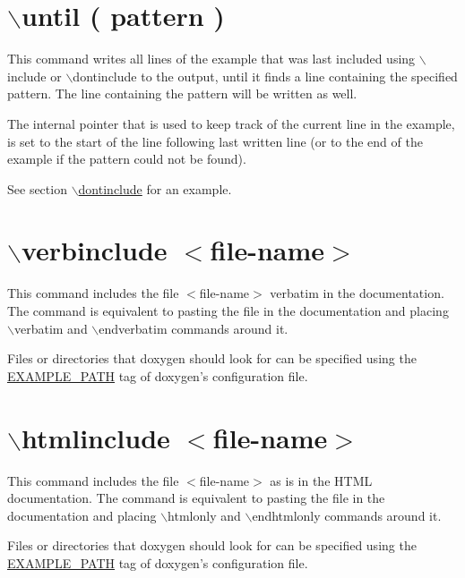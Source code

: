  \hypertarget{commands_cmduntil}{}\section{$\backslash$until ( pattern )}\label{commands_cmduntil}
 This command writes all lines of the example that was last included using $\backslash$include or $\backslash$dontinclude to the output, until it finds a line containing the specified pattern. The line containing the pattern will be written as well.

The internal pointer that is used to keep track of the current line in the example, is set to the start of the line following last written line (or to the end of the example if the pattern could not be found).

See section \hyperlink{commands_cmddontinclude}{$\backslash$dontinclude} for an example.



 \hypertarget{commands_cmdverbinclude}{}\section{$\backslash$verbinclude $<$file-\/name$>$}\label{commands_cmdverbinclude}
 This command includes the file $<$file-\/name$>$ verbatim in the documentation. The command is equivalent to pasting the file in the documentation and placing $\backslash$verbatim and $\backslash$endverbatim commands around it.

Files or directories that doxygen should look for can be specified using the \hyperlink{config_cfg_example_path}{EXAMPLE\_\-PATH} tag of doxygen's configuration file.



 \hypertarget{commands_cmdhtmlinclude}{}\section{$\backslash$htmlinclude $<$file-\/name$>$}\label{commands_cmdhtmlinclude}
 This command includes the file $<$file-\/name$>$ as is in the HTML documentation. The command is equivalent to pasting the file in the documentation and placing $\backslash$htmlonly and $\backslash$endhtmlonly commands around it.

Files or directories that doxygen should look for can be specified using the \hyperlink{config_cfg_example_path}{EXAMPLE\_\-PATH} tag of doxygen's configuration file.





